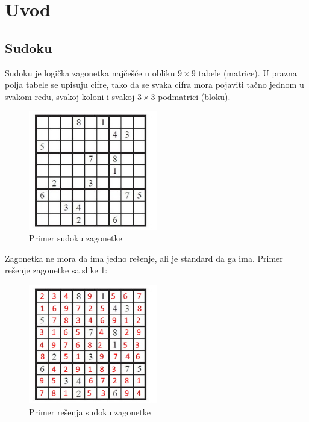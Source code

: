 \documentclass[a4paper]{article}
\begin{document}
    
    
    
    \section{Uvod}
    \subsection{Sudoku}
    Sudoku je logička zagonetka najčešće u obliku $9 \times 9$ tabele (matrice).
    U prazna polja tabele se upisuju cifre, tako da se svaka cifra mora pojaviti
    tačno jednom u svakom redu, svakoj koloni i svakoj $3\times 3$ podmatrici (bloku).
    \begin{figure}[h]
        \centering
        \includegraphics[width=0.5\textwidth, height=0.5\textwidth]{img/sudoku-example.jpg}
        \caption{Primer sudoku zagonetke}
    \end{figure}
    \par Zagonetka ne mora da ima jedno rešenje, ali je standard da ga ima. Primer rešenje zagonetke sa slike 1:
    \begin{figure}[h]
        \centering
        \includegraphics[width=0.5\textwidth, height=0.5\textwidth]{img/sudoku-example-sol.jpg}
        \caption{Primer rešenja sudoku zagonetke}
    \end{figure}
    
\end{document}
